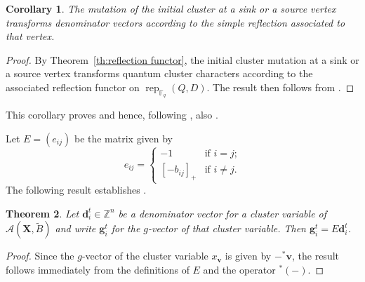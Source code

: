 \documentclass[12pt]{amsart}
\newtheorem{theorem}{Theorem}
\newtheorem{corollary}[theorem]{Corollary}
\newcommand{\bfd}{\mathbf{d}}
\newcommand{\bfg}{\mathbf{g}}
\newcommand{\bfv}{\mathbf{v}}
\newcommand{\bfX}{\mathbf{X}}
\newcommand{\cA}{\mathcal{A}}
\newcommand{\FF}{\mathbb{F}}
\newcommand{\rep}{\operatorname{rep}}
\newcommand{\ZZ}{\mathbb{Z}}
\begin{document}
  \begin{corollary}
    The mutation of the initial cluster at a sink or a source vertex transforms denominator vectors according to the simple reflection associated to that vertex.
  \end{corollary}
  \begin{proof}
    By Theorem~\ref{th:reflection functor}, the initial cluster mutation at a sink or a source vertex transforms quantum cluster characters according to the associated reflection functor on $\rep_{\FF_q}(Q,D)$.  The result then follows from \cite[Prop. 2.1]{dlab-ringel}.
  \end{proof}
  This corollary proves \cite[Conj. 2.8]{reading-stella} and hence, following \cite[Prop. 2.10]{reading-stella}, also \cite[Conj. 2.7]{reading-stella}.

  Let $E=(e_{ij})$ be the matrix given by
  \[e_{ij}=\begin{cases} -1 & \text{if $i=j$;}\\ [-b_{ij}]_+ & \text{if $i\ne j$.}\end{cases}\]
  The following result establishes \cite[Conj. 3.21]{reading-speyer}.
  \begin{theorem}
    \label{th:d to g}
    Let $\bfd_i^t\in\ZZ^n$ be a denominator vector for a cluster variable of $\cA(\bfX,\widetilde{B})$ and write $\bfg_i^t$ for the $g$-vector of that cluster variable.  Then $\bfg_i^t=E\bfd_i^t$.
  \end{theorem}
  \begin{proof}
    Since the $g$-vector of the cluster variable $x_\bfv$ is given by $-{}^*\bfv$, the result follows immediately from the definitions of $E$ and the operator ${}^*(-)$.
  \end{proof}
\end{document}
